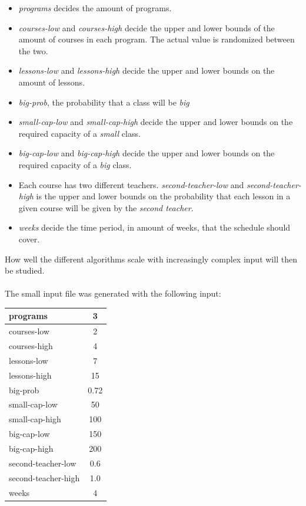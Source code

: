 \documentclass[titlepage,a4paper]{article}
\begin{document}
\begin{itemize}
  \item \emph{programs} decides the amount of programs.
  \item \emph{courses-low} and \emph{courses-high} decide the upper and lower bounds of the amount of courses in each program. The actual value is randomized between the two.
  \item \emph{lessons-low} and \emph{lessons-high} decide the upper and lower bounds on the amount of lessons.
  \item \emph{big-prob}, the probability that a class will be \emph{big}
  \item \emph{small-cap-low} and \emph{small-cap-high} decide the upper and lower bounds on the required capacity of a \emph{small} class.
  \item \emph{big-cap-low} and \emph{big-cap-high} decide the upper and lower bounds on the required capacity of a \emph{big} class.
  \item Each course has two different teachers. \emph{second-teacher-low} and \emph{second-teacher-high} is the upper and lower bounds on the probability that each lesson in a given course will be given by the \emph{second teacher}.
  \item \emph{weeks} decide the time period, in amount of weeks, that the schedule should cover.
\end{itemize} 
How well the different algorithms scale with increasingly complex input will then be studied. \\\\
The small input file was generated with the following input: \\
\medskip
\begin{tabular}{| l | c |}
  \hline
  programs & 3 \\
  \hline
  courses-low & 2 \\
  \hline
  courses-high & 4 \\
  \hline
  lessons-low & 7 \\
  \hline  
  lessons-high & 15 \\
  \hline  
  big-prob & 0.72 \\
  \hline  
  small-cap-low & 50 \\
  \hline  
  small-cap-high & 100 \\
  \hline  
  big-cap-low & 150 \\
  \hline  
  big-cap-high & 200 \\
  \hline  
  second-teacher-low & 0.6 \\
  \hline  
  second-teacher-high & 1.0 \\
  \hline
  weeks & 4 \\
  \hline
\end{tabular}
\end{document}
